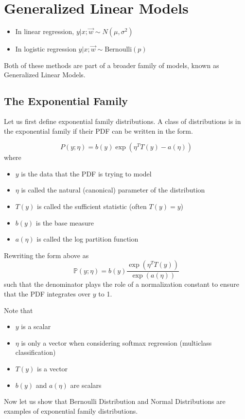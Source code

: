 \documentclass[12pt]{scrartcl}
\begin{document}
\section{Generalized Linear Models}
\begin{itemize}
    \item In linear regression, $y | x; \vec{w} \sim N(\mu, \sigma^2)$
    \item In logistic regression $y | x; \vec{w} \sim \text{Bernoulli}(p)$
\end{itemize}

Both of these methods are part of a broader family of models, known as Generalized Linear Models.

\subsection{The Exponential Family}

Let us first define exponential family distributions. A class of distributions is in the exponential family if their PDF can be written in the form.

\[P(y; \eta ) = b(y)\exp(\eta^TT(y) - a(\eta))\]
where
\begin{itemize}
    \item $y$ is the data that the PDF is trying to model
    \item $\eta$ is called the natural (canonical) parameter of the distribution
    \item $T(y)$ is called the sufficient statistic (often $T(y) = y$)
    \item $b(y)$ is the base measure
    \item $a(\eta)$ is called the log partition function
\end{itemize}

Rewriting the form above as 
\[\mathbb{P}(y; \eta) = b(y) \frac{\exp(\eta^TT(y))}{\exp(a(\eta))}\] such that the denominator plays the role of a normalization constant to ensure that the PDF integrates over $y$ to 1.

\begin{note}
Note that 
    \begin{itemize}
        \item $y$ is a scalar
        \item $\eta$ is only a vector when considering softmax regression (multiclass classification)
        \item $T(y)$ is a vector
        \item $b(y)$ and $a(\eta)$ are scalars
    \end{itemize}
\end{note}
Now let us show that Bernoulli Distribution and Normal Distributions are examples of exponential family distributions.
\end{document}

